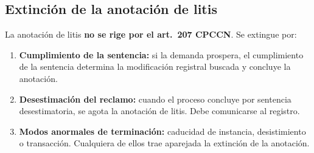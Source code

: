\documentclass[12pt,oneside]{book}
\begin{document}
\subsection{Extinción de la anotación de litis}

La anotación de litis \textbf{no se rige por el art.\ 207 CPCCN}. Se extingue por:
\begin{enumerate}
    \item \textbf{Cumplimiento de la sentencia:} si la demanda prospera, el cumplimiento de la sentencia determina la modificación registral buscada y concluye la anotación.
    \item \textbf{Desestimación del reclamo:} cuando el proceso concluye por sentencia desestimatoria, se agota la anotación de litis. Debe comunicarse al registro.
    \item \textbf{Modos anormales de terminación:} caducidad de instancia, desistimiento o transacción. Cualquiera de ellos trae aparejada la extinción de la anotación.
\end{enumerate}
\end{document}
